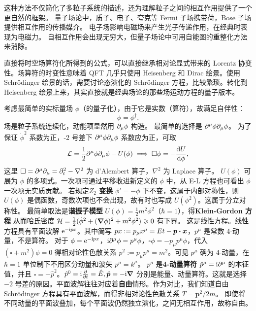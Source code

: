 这种方法不仅简化了多粒子系统的描述，还为理解粒子之间的相互作用提供了一个更自然的框架。
量子场论中，质子、电子、夸克等 Fermi 子场携带荷，Bose 子场提供相互作用的传播媒介。
电子场影响电磁场来产生光子传递作用，在经典时表现为电磁力。
自相互作用会出现无穷大，但量子场论中可用自能图的重整化方法来消除。

直接将时空场算符化所得到的公式，可以直接继承相对论显式带来的 Lorentz 协变性。场算符的时变性意味着 QFT 几乎只使用 Heisenberg 和 Dirac 绘景。使用 Schr\"odinger 绘景的话，需要讨论态演化的 Schr\"odinger 方程，比较繁琐。转化到 Heisenberg 绘景上来，其实直接就是经典场论的那些场运动方程的量子版本。

考虑最简单的实标量场 $\phi$（的量子化），由于它是实数（算符），故满足自伴性：
\[ \phi =  \phi^\dagger.\]
场是粒子系统连续化，动能项显然用 $\partial_\mu\phi$ 构造。
最简单的选择是 $\partial^\mu\phi\partial_\mu\phi$。
为了保证 $\dot\phi^2$ 系数为正，-2 号差下 $\partial^\mu\phi\partial_\mu\phi$ 系数应为正，可取
\[\mathcal{L}= \frac 12\partial^\mu\phi\partial_\mu\phi-U(\phi)\implies \square\phi = -\dv{U}{\phi},\]
这里 $\square=\partial^\mu\partial_\mu = \partial_t^2 - \nabla^2$ 为 d'Alembert 算子，$\nabla^2$ 为 Laplace 算子。
$U(\phi)$ 可展为 $\phi$ 的多项式。一次项可通过平移收进新定义的 $\phi$ 中，从 E-L 方程也可看出 $\phi$ 一次项无实质贡献。
若规定\textbf{$Z_2$ 变换} $\phi'=-\phi$ 下不变，这属于内部对称性，则 $U(\phi)$ 是偶函数，奇数次项也不会出现，故有时也写成 $U(\phi^2)$。这属于分立对称性。
最简单取法是\textbf{谐振子模型} $U(\phi)=\frac 12 m^2\phi^2$（$\hbar = 1$），得\textbf{Klein-Gordon 方程}
从而哈氏密度 $\mathcal{H} = \frac 12 (\dot\phi^2 + (\grad\phi)^2 + m^2\phi^2) \geqslant 0$ 有下界。
这是线性方程。线性方程具有平面波解 $\mathrm{e}^{-\mathrm{i} px}$。其中简写 $px:=p_\mu x^\mu=Et-\bm p\vdot\bm x$，$p^\mu$ 是常数 4-动量，不是算符。
对于 $\phi=\mathrm{e}^{-\mathrm{i} px}$，$\mathrm{i}\partial^\mu\phi = p^\mu\phi$，$\square\phi = -p_\mu p^\mu\phi$，代入 $(\square+m^2)\phi=0$ 得相对论性色散关系 $p^2:=p_\mu p^\mu=m^2$。可见 $p^\mu$ 确为 4-动量，在 $\hbar=1$ 单位制下不用区分动量和波矢 $p^\mu=k^\mu$。
$p^\mu$ 是\textbf{4-动量算符} $\hat p^\mu=\mathrm{i}\partial^\mu$ 的本征值，并且
$\square=-\hat p^2$。$\hat p^0 = \mathrm{i}\pdv{t} = \hat E,\hat{\bm p} = -\mathrm{i}\grad$ 分别是能量、动量算符。这就是选择 $-2$ 号差的原因。平面波解往往对应着\textbf{自由}情形。作为对比，我们知道自由 Schr\"odinger 方程具有平面波解，而得非相对论性色散关系 $T=\bm p^2/2m$。
即使将不同动量的平面波叠加，每个平面波仍然独立演化，之间无相互作用，故称自由。

